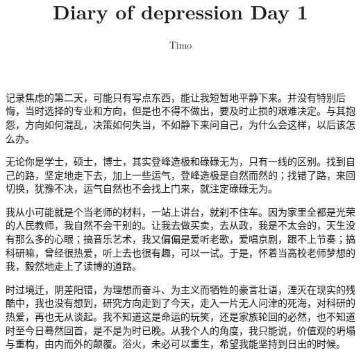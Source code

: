 \documentclass[11pt]{ctexart}
\title{Diary of depression Day 1}
\author{Timo}
\begin{document}
\maketitle

记录焦虑的第二天，可能只有写点东西，能让我短暂地平静下来。并没有特别后悔，当时选择的专业和方向，但是也不得不做出，要及时止损的艰难决定。与其抱怨，方向如何混乱，决策如何失当，不如静下来问自己，为什么会这样，以后该怎么办。\par
无论你是学士，硕士，博士，其实登峰造极和碌碌无为，只有一线的区别。找到自己的路，坚定地走下去，加上一些运气，登峰造极是自然而然的；找错了路，来回切换，犹豫不决，运气自然也不会找上门来，就注定碌碌无为。\par
我从小可能就是个当老师的材料，一站上讲台，就刹不住车。因为家里全都是光荣的人民教师，我自然不会干别的。让我去做买卖，去从政，我是不太会的，天生没有那么多的心眼；搞音乐艺术，我又偏偏是爱听老歌，爱唱京剧，跟不上节奏；搞科研嘛，曾经很热爱，听上去也很有趣，可以一试。于是，怀着当高校老师梦想的我，毅然地走上了读博的道路。\par
时过境迁，阴差阳错，为理想而奋斗、为主义而牺牲的豪言壮语，湮灭在现实的残酷中，我也没有想到，研究方向走到了今天，走入一片无人问津的死海，对科研的热爱，再也无从谈起。我不知道这是命运的玩笑，还是家族轮回的必然，也不知道时至今日蓦然回首，是不是为时已晚。从我个人的角度，我只能说，价值观的坍塌与重构，由内而外的颠覆。浴火，未必可以重生，希望我能坚持到日出的时候。\par
\end{document}
